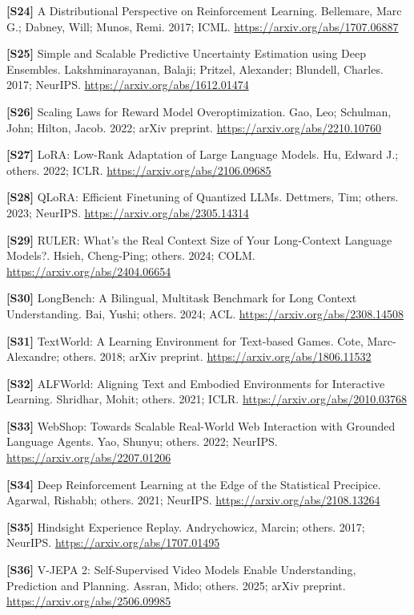 \documentclass[
  11pt,
  a4paper,
]{article}
\begin{document}
\textbf{{[}S24{]}} A Distributional Perspective on Reinforcement
Learning. Bellemare, Marc G.; Dabney, Will; Munos, Remi. 2017; ICML.
\url{https://arxiv.org/abs/1707.06887}

\textbf{{[}S25{]}} Simple and Scalable Predictive Uncertainty Estimation
using Deep Ensembles. Lakshminarayanan, Balaji; Pritzel, Alexander;
Blundell, Charles. 2017; NeurIPS. \url{https://arxiv.org/abs/1612.01474}

\textbf{{[}S26{]}} Scaling Laws for Reward Model Overoptimization. Gao,
Leo; Schulman, John; Hilton, Jacob. 2022; arXiv preprint.
\url{https://arxiv.org/abs/2210.10760}

\textbf{{[}S27{]}} LoRA: Low-Rank Adaptation of Large Language Models.
Hu, Edward J.; others. 2022; ICLR.
\url{https://arxiv.org/abs/2106.09685}

\textbf{{[}S28{]}} QLoRA: Efficient Finetuning of Quantized LLMs.
Dettmers, Tim; others. 2023; NeurIPS.
\url{https://arxiv.org/abs/2305.14314}

\textbf{{[}S29{]}} RULER: What's the Real Context Size of Your
Long-Context Language Models?. Hsieh, Cheng-Ping; others. 2024; COLM.
\url{https://arxiv.org/abs/2404.06654}

\textbf{{[}S30{]}} LongBench: A Bilingual, Multitask Benchmark for Long
Context Understanding. Bai, Yushi; others. 2024; ACL.
\url{https://arxiv.org/abs/2308.14508}

\textbf{{[}S31{]}} TextWorld: A Learning Environment for Text-based
Games. Cote, Marc-Alexandre; others. 2018; arXiv preprint.
\url{https://arxiv.org/abs/1806.11532}

\textbf{{[}S32{]}} ALFWorld: Aligning Text and Embodied Environments for
Interactive Learning. Shridhar, Mohit; others. 2021; ICLR.
\url{https://arxiv.org/abs/2010.03768}

\textbf{{[}S33{]}} WebShop: Towards Scalable Real-World Web Interaction
with Grounded Language Agents. Yao, Shunyu; others. 2022; NeurIPS.
\url{https://arxiv.org/abs/2207.01206}

\textbf{{[}S34{]}} Deep Reinforcement Learning at the Edge of the
Statistical Precipice. Agarwal, Rishabh; others. 2021; NeurIPS.
\url{https://arxiv.org/abs/2108.13264}

\textbf{{[}S35{]}} Hindsight Experience Replay. Andrychowicz, Marcin;
others. 2017; NeurIPS. \url{https://arxiv.org/abs/1707.01495}

\textbf{{[}S36{]}} V-JEPA 2: Self-Supervised Video Models Enable
Understanding, Prediction and Planning. Assran, Mido; others. 2025;
arXiv preprint. \url{https://arxiv.org/abs/2506.09985}
\end{document}
